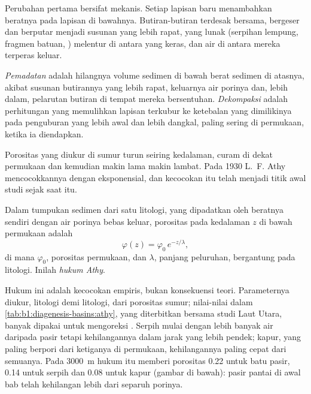 Perubahan pertama bersifat mekanis. Setiap lapisan baru menambahkan beratnya pada lapisan di bawahnya. Butiran-butiran terdesak bersama, bergeser dan berputar menjadi susunan yang lebih rapat, yang lunak (serpihan lempung, fragmen batuan, ) melentur di antara yang keras, dan air di antara mereka terperas keluar.

\begin{definition}\label{def:b1:diagenesis-basins:compaction}
\emph{Pemadatan} adalah hilangnya volume sedimen di bawah berat sedimen di atasnya, akibat susunan butirannya yang lebih rapat, keluarnya air porinya dan, lebih dalam, pelarutan butiran di tempat mereka bersentuhan. \emph{Dekompaksi} adalah perhitungan yang memulihkan lapisan terkubur ke ketebalan yang dimilikinya pada penguburan yang lebih awal dan lebih dangkal, paling sering di permukaan, ketika ia diendapkan.
\end{definition}

Porositas yang diukur di sumur turun seiring kedalaman, curam di dekat permukaan dan kemudian makin lama makin lambat. Pada 1930 L.~F. Athy mencocokkannya dengan eksponensial, dan kecocokan itu telah menjadi titik awal studi  sejak saat itu.

\begin{proposition}\label{prop:b1:diagenesis-basins:athy}
Dalam tumpukan sedimen dari satu litologi, yang dipadatkan oleh beratnya sendiri dengan air porinya bebas keluar, porositas pada kedalaman $z$ di bawah permukaan adalah
\[
  \varphi(z) = \varphi_0\, e^{-z/\lambda},
\]
di mana $\varphi_0$, porositas permukaan, dan $\lambda$, panjang peluruhan, bergantung pada litologi. Inilah \emph{hukum Athy}.
\end{proposition}
\admitted

Hukum ini adalah kecocokan empiris, bukan konsekuensi teori. Parameternya diukur, litologi demi litologi, dari porositas sumur; nilai-nilai dalam \cref{tab:b1:diagenesis-basins:athy}, yang diterbitkan bersama studi  Laut Utara, banyak dipakai untuk mengoreksi . Serpih mulai dengan lebih banyak air daripada pasir tetapi kehilangannya dalam jarak yang lebih pendek; kapur, yang paling berpori dari ketiganya di permukaan, kehilangannya paling cepat dari semuanya. Pada \qty{3000}{m} hukum itu memberi porositas \num{0.22} untuk batu pasir, \num{0.14} untuk serpih dan \num{0.08} untuk kapur (gambar di bawah): pasir pantai di awal bab telah kehilangan lebih dari separuh porinya.

